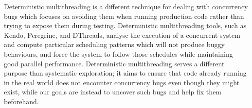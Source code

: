 Deterministic multithreading is a different technique for dealing with concurrency bugs which focuses on avoiding them when running production code rather than trying to expose them during testing. Deterministic multithreading tools, such as Kendo\cite{kendo}, Peregrine\hspace{0in}\cite{peregrine}, and DThreads\cite{dthreads}, analyse the execution of a concurrent system and compute particular scheduling patterns which will not produce buggy behaviours, and force the system to follow those schedules while maintaining good parallel performance.
Deterministic multithreading serves a different purpose than systematic exploration; it aims to ensure that code already running in the real world does not encounter concurrency bugs even though they might exist, while our goals are instead to uncover such bugs and help fix them beforehand.

